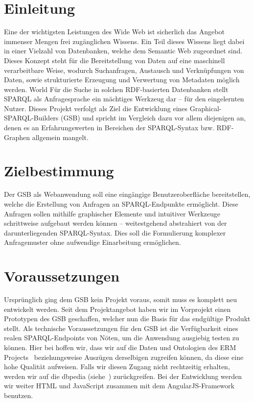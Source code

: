 \section{Einleitung}
Eine der wichtigsten Leistungen des Wide Web ist sicherlich das
Angebot immenser Mengen frei zugänglichen Wissens.
Ein Teil dieses Wissens liegt dabei in einer Vielzahl von Datenbanken,
welche dem Semantic Web zugeordnet sind.
Dieses Konzept steht für die Bereitstellung von Daten auf eine
maschinell verarbeitbare Weise, wodurch Suchanfragen, Austausch und
Verknüpfungen von Daten, sowie strukturierte Erzeugung und Verwertung
von Metadaten möglich werden.
World 
Für die Suche in solchen RDF-basierten Datenbanken stellt SPARQL als Anfragesprache ein mächtiges Werkzeug dar -- für den eingelernten Nutzer. Dieses Projekt verfolgt als Ziel die Entwicklung eines Graphical-SPARQL-Builders (GSB) und spricht im Vergleich dazu vor allem diejenigen an, denen es an Erfahrungswerten in Bereichen der SPARQL-Syntax bzw. RDF-Graphen allgemein mangelt.

\section{Zielbestimmung}
Der GSB als Webanwendung soll eine eingängige Benutzeroberfläche
bereitstellen, welche die Erstellung von Anfragen an SPARQL-Endpunkte
ermöglicht. Diese Anfragen sollen mithilfe graphischer Elemente und
intuitiver Werkzeuge schrittweise aufgebaut werden können --
weitestgehend abstrahiert von der darunterliegenden
SPARQL-Syntax. Dies soll die Formulierung komplexer Anfragemuster ohne
aufwendige Einarbeitung ermöglichen.

\section{Voraussetzungen}
Ursprünglich ging dem GSB kein Projekt voraus, somit muss es komplett neu entwickelt werden. Seit dem Projektangebot haben wir im Vorprojekt einen Prototypen des GSB geschaffen, welcher nun die Basis für das endgültige Produkt stellt.
Als technische Voraussetzungen für den GSB ist die Verfügbarkeit eines
realen SPARQL-Endpoints von Nöten, um die Anwendung ausgiebig testen
zu können. Hier bei hoffen wir, dass wir auf die Daten und Ontologien
des ERM Projects~\cite{aksw} beziehungsweise
Auszügen derselbigen zugreifen können, da diese eine hohe Qualität
aufweisen. Falls wir diesen Zugang nicht rechtzeitig erhalten, werden
wir auf die dbpedia (siehe~\cite{dbpedia}) zurückgreifen.
Bei der Entwicklung werden wir weiter HTML und JavaScript zusammen mit
dem AngularJS-Framework benutzen.

